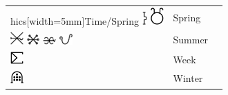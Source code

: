 \documentclass[british,final,landscape]{scrartcl}
\begin{document}
\begin{refsection}
\begin{supertabular}{p{0.3\textwidth}p{0.34\textwidth}p{0.34\textwidth}}
hics[width=5mm]{Time/Spring} \includegraphics[height=5mm]{Time/Spring2} \includegraphics[width=5mm]{Time/Spring3} & Spring & \\
   \includegraphics[width=5mm]{Time/Summer} \includegraphics[width=5mm]{Time/Summer2} \includegraphics[width=5mm]{Time/Summer3} \includegraphics[width=5mm]{Time/Summer4} & Summer & \\
   \includegraphics[width=5mm]{Time/Week} & Week & \\
   \includegraphics[width=5mm]{Time/Winter} & Winter & \\

\end{supertabular}
\end{refsection}
\end{document}
